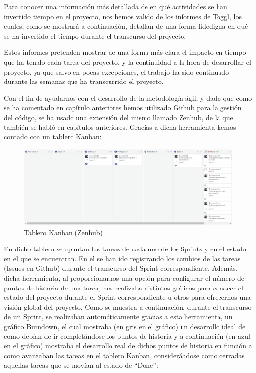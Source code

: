 \documentclass[11pt,openany]{book}
\begin{document}

Para conocer una información más detallada de en qué actividades se han invertido tiempo en el proyecto, nos hemos valido de los informes de Toggl, los cuales, como se mostrará a continuación, detallan de una forma fidedigna en qué se ha invertido el tiempo durante el transcurso del proyecto.

Estos informes pretenden mostrar de una forma más clara el impacto en tiempo que ha tenido cada tarea del proyecto, y la continuidad a la hora de desarrollar el proyecto, ya que salvo en pocas excepciones, el trabajo ha sido continuado durante las semanas que ha transcurrido el proyecto.

Con el fin de ayudarnos con el desarrollo de la metodología ágil, y dado que como se ha comentado en capítulo anteriores hemos utilizado Github para la gestión del código, se ha usado una extensión del mismo llamado Zenhub, de la que también se habló en capítulos anteriores. Gracias a dicha herramienta hemos contado con un tablero Kanban:

\begin{figure}[H]
\centering
\includegraphics[totalheight=5cm]{kanban.png}
\caption{Tablero Kanban (Zenhub)}
\end{figure}
\par\bigskip 
\noindent

En dicho tablero se apuntan las tareas de cada uno de los Sprints y en el estado en el que se encuentran. En el se han ido registrando los cambios de las tareas (Issues en Github) durante el transcurso del Sprint correspondiente. Además, dicha herramienta, al proporcionarnos una opción para configurar el número de puntos de historia de una tarea, nos realizaba distintos gráficos para conocer el estado del proyecto durante el Sprint correspondiente u otros para ofrecernos una visión global del proyecto. Como se muestra a continuación, durante el transcurso de un Sprint, se realizaban automáticamente gracias a esta herramienta, un gráfico Burndown, el cual mostraba (en gris en el gráfico) un desarrollo ideal de como debían de ir completándose los puntos de historia y a continuación (en azul en el gráfico) mostraba el desarrollo real de dichos puntos de historia en función a como avanzaban las tareas en el tablero Kanban, considerándose como cerradas aquellas tareas que se movían al estado de ``Done'': 
\end{document}
